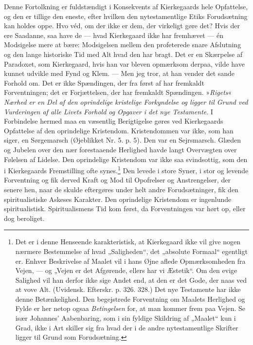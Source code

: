 \documentclass[12pt,a4paper,openany]{book}
\newcommand{\opage}[1]{\marginnote{\footnotesize\textit{[#1]}}}
\begin{document}
Denne Fortolkning er fuldstændigt i Konsekvents af
Kierkegaards hele Opfattelse, og den er tillige den
eneste, efter hvilken den nytestamentlige Etiks Forudsætning
kan holdes oppe. Hvo véd, om der ikke er dem,
der virkeligt gøre det? Hvis der ere Saadanne, saa have
de --- hvad Kierkegaard ikke har fremhævet --- én Modsigelse
mere at bære: Modsigelsen mellem den profeterede
snare Afslutning og den lange historiske Tid med Alt
hvad den har bragt. Det er en Skærpelse af Paradoxet,
som Kierkegaard, hvis han var bleven opmærksom derpaa,
vilde have kunnet udvikle med Fynd og Klem. ---
Men jeg tror, at han vender det sande Forhold om. Det
er ikke Spændingen, der fra først af har fremkaldt Forventningen;
det er Forjættelsen, der har fremkaldt Spændingen.
»\textit{Rigets}« \textit{Nærhed er en Del af den oprindelige
kristelige Forkyndelse og ligger til Grund ved Vurderingen
af alle Livets Forhold og Opgaver i det nye Testamente}.
I Forbindelse hermed maa en væsentlig Berigtigelse
gøres ved Kierkegaards Opfattelse af den oprindelige
Kristendom. Kristendommen var ikke, som han siger,
en Sørgemarsch (Øjeblikket Nr. 5. p. 5). Den var en
Sejrsmarsch. Glæden og Jubelen over den nær forestaaende
Herlighed havde langt Overvægten over Følelsen
af Lidelse. Den oprindelige Kristendom var ikke saa svindsottig,
som den i Kierkegaards Fremstilling ofte synes.\footnote{Det er i denne Henseende karakteristisk, at Kierkegaard ikke vil give nogen nærmere Bestemmelse af hvad „Saligheden“, det „absolute Formaal“ egentligt er. Enhver Beskrivelse af Maalet vil i hans Øjne aflede Opmærksomheden fra Vejen, --- og „Vejen er det Afgørende, ellers har vi Æstetik“. Om den evige Salighed vil han derfor ikke sige Andet end, at den er det Gode, der naas ved at vove Alt. (Uvidensk. Efterskr. p. 326. 328.) Det nye Testamente har ikke denne Betænkelighed. Den begejstrede Forventning om Maalets Herlighed og Fylde er her netop ogsaa \textit{Betingelsen} for, at man kommer frem paa Vejen. Se især Johannes' Aabenbaring, som i sin fyldige Skildring af „Maalet“ kun i Grad, ikke i Art skiller sig fra hvad der i de andre nytestamentlige Skrifter ligger til Grund som Forudsætning.}
\opage{155}Den levede i store Syner, i stor og levende Forventning
og fik derved Kraft og Mod til Opofrelser og Anstrengelser,
der senere hen, naar de skulde eftergøres under
helt andre Forudsætninger, fik den spiritualistiske Askeses
Karakter. Den oprindelige Kristendom er ingenlunde
spiritualistisk. Spiritualismens Tid kom først, da Forventningen
var hørt op, eller dog beroliget.
\end{document}
